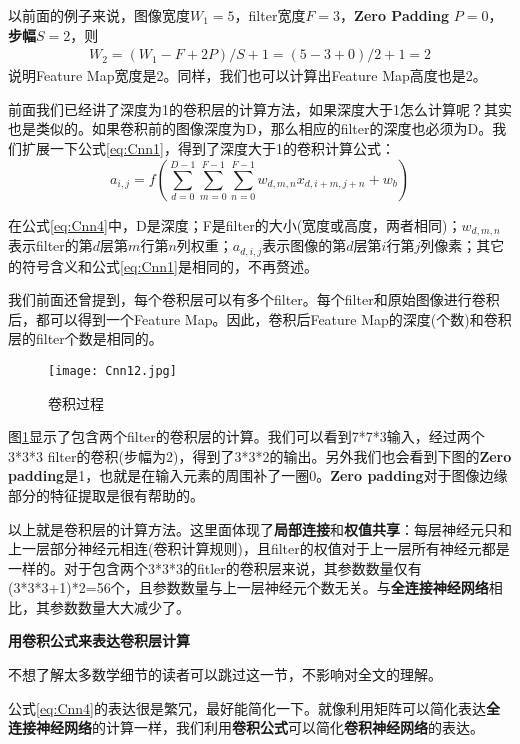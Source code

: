 以前面的例子来说，图像宽度\(W_1=5\)，filter宽度\(F=3\)，\textbf{Zero Padding} \(P=0\)，\textbf{步幅}\(S=2\)，则
\begin{align*}
	W_2 = (W_1 - F + 2P)/S + 1= (5 - 3 + 0)/2 + 1=2
\end{align*}
说明Feature Map宽度是2。同样，我们也可以计算出Feature Map高度也是2。

前面我们已经讲了深度为1的卷积层的计算方法，如果深度大于1怎么计算呢？其实也是类似的。如果卷积前的图像深度为D，那么相应的filter的深度也必须为D。我们扩展一下公式\ref{eq:Cnn1}，得到了深度大于1的卷积计算公式：
\begin{equation}
	\label{eq:Cnn4}
	a_{i,j}=f(\sum_{d=0}^{D-1}\sum_{m=0}^{F-1}\sum_{n=0}^{F-1}w_{d,m,n}x_{d,i+m,j+n}+w_b)
\end{equation}


在公式\ref{eq:Cnn4}中，D是深度；F是filter的大小(宽度或高度，两者相同)；\(w_{d,m,n}\)表示filter的第\(d\)层第\(m\)行第\(n\)列权重；\(a_{d,i,j}\)表示图像的第\(d\)层第\(i\)行第\(j\)列像素；其它的符号含义和公式\ref{eq:Cnn1}是相同的，不再赘述。

我们前面还曾提到，每个卷积层可以有多个filter。每个filter和原始图像进行卷积后，都可以得到一个Feature Map。因此，卷积后Feature Map的深度(个数)和卷积层的filter个数是相同的。

\begin{figure}[!h]
	\centering
	\texttt{[image: Cnn12.jpg]}
	\caption{卷积过程}
	\label{fig:Cnn12}
\end{figure}

图\ref{fig:Cnn12}显示了包含两个filter的卷积层的计算。我们可以看到7*7*3输入，经过两个3*3*3 filter的卷积(步幅为2)，得到了3*3*2的输出。另外我们也会看到下图的\textbf{Zero padding}是1，也就是在输入元素的周围补了一圈0。\textbf{Zero padding}对于图像边缘部分的特征提取是很有帮助的。


以上就是卷积层的计算方法。这里面体现了\textbf{局部连接}和\textbf{权值共享}：每层神经元只和上一层部分神经元相连(卷积计算规则)，且filter的权值对于上一层所有神经元都是一样的。对于包含两个3*3*3的fitler的卷积层来说，其参数数量仅有(3*3*3+1)*2=56个，且参数数量与上一层神经元个数无关。与\textbf{全连接神经网络}相比，其参数数量大大减少了。

\textbf{用卷积公式来表达卷积层计算}

不想了解太多数学细节的读者可以跳过这一节，不影响对全文的理解。

公式\ref{eq:Cnn4}的表达很是繁冗，最好能简化一下。就像利用矩阵可以简化表达\textbf{全连接神经网络}的计算一样，我们利用\textbf{卷积公式}可以简化\textbf{卷积神经网络}的表达。

